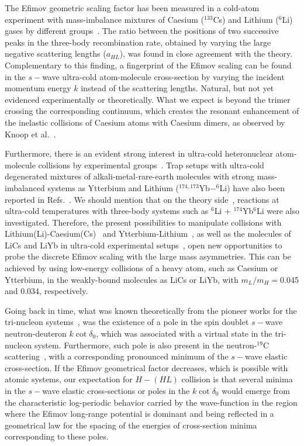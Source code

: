 \documentclass[twocolumn,amsmath,amssymb,epsfig,aps,prl]{revtex4}
\begin{document}
The Efimov geometric scaling factor has been measured in a cold-atom experiment with mass-imbalance mixtures of 
Caesium ($^{133}$Cs) and Lithium ($^6$Li) gases by different groups~\cite{2014tung,2016ulmanis}.
The ratio between the positions of two successive  peaks in the three-body recombination rate, obtained by varying the 
large negative scattering lengths ($a_{HL}$), was found in close agreement with the theory. 
Complementary to this finding, a fingerprint of the Efimov scaling can be found in the $s-$wave ultra-cold atom-molecule 
cross-section by varying the incident momentum energy $k$ instead of the scattering lengths. Natural, but not yet evidenced 
experimentally or theoretically. What we expect is beyond the trimer crossing the corresponding continuum, which creates 
the resonant enhancement of the inelastic collisions of Caesium atoms with Caesium dimers, as observed by Knoop et 
al.~\cite{2009knoop}. 

Furthermore, there is an evident strong interest in ultra-cold heteronuclear atom-molecule collisions  by experimental 
groups~\cite{2010barontini,2013bloom,2014hu}.  Trap setups with ultra-cold degenerated mixtures of 
alkali-metal-rare-earth molecules with strong mass-imbalanced systems as Ytterbium and Lithium ($^{174,173}$Yb$-^6$Li) 
have also been reported in Refs.~\cite{2011hara,2011hansen}. We should mention that on the theory side~\cite{2015makrides}, 
reactions at ultra-cold temperatures with three-body systems such as $^6$Li +  $^{174}$Yb$^6$Li were also investigated.
Therefore, the present possibilities to manipulate collisions with Lithium(Li)-Caesium(Cs)~\cite{2006krems} and 
Ytterbium-Lithium~\cite{2011hara,2011hansen}, as well as the molecules of LiCs and LiYb in ultra-cold 
experimental setups~\cite{2006kraft}, open new opportunities to probe the discrete Efimov scaling with the large 
mass asymmetries. This can be achieved by using low-energy collisions of a heavy atom, such as Caesium or 
Ytterbium, in the weakly-bound molecules as LiCs or LiYb, with $m_L/m_H=$0.045 and 0.034, respectively.  

Going back in time, what was known theoretically from 
the pioneer works for the tri-nucleon 
systems~\cite{1960delves,1967vanoers,1976whiting,1979girard},  was  the
existence of a pole in the spin doublet $s-$wave neutron-deuteron $k\cot\delta_0$, 
which was associated with a virtual state in the tri-nucleon system. Furthermore, such pole is also 
present in the neutron-$^{19}$C scattering~\cite{2008yamashita,2016shalchi,2017Deltuva}, with a corresponding 
pronounced minimum of the $s-$wave elastic cross-section.  If the Efimov geometrical factor decreases,
which is possible with atomic systems, 
our expectation for $H-(HL)$ collision is that several minima in the $s-$wave elastic cross-sections or 
poles in the $k\cot\delta_0$ would
emerge from the characteristic log-periodic behavior carried by the wave-function in the region where the
 Efimov long-range potential is dominant and being reflected in a geometrical 
law for the spacing of the energies of cross-section  minima corresponding to these  poles.
 
\end{document}
